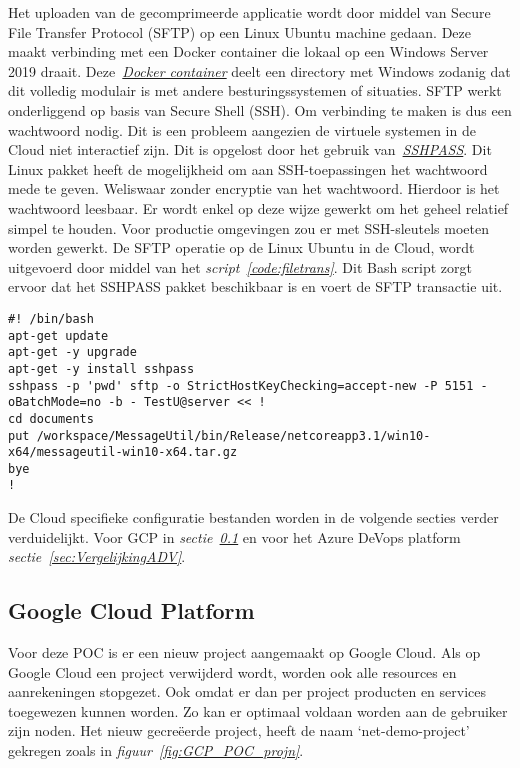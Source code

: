 Het uploaden van de gecomprimeerde applicatie wordt door middel van Secure File Transfer Protocol (SFTP) op een Linux Ubuntu machine gedaan. Deze maakt verbinding met een Docker container die lokaal op een Windows Server 2019 draait. Deze\emph{~\href{https://hub.docker.com/r/atmoz/sftp/}{Docker container}} deelt een directory met Windows zodanig dat dit volledig modulair is met andere besturingssystemen of situaties. SFTP werkt onderliggend op basis van Secure Shell (SSH). Om verbinding te maken is dus een wachtwoord nodig. Dit is een probleem aangezien de virtuele systemen in de Cloud niet interactief zijn. Dit is opgelost door het gebruik van\emph{~\href{https://linux.die.net/man/1/sshpass}{SSHPASS}}. Dit Linux pakket heeft de mogelijkheid om aan SSH-toepassingen het wachtwoord mede te geven. Weliswaar zonder encryptie van het wachtwoord. Hierdoor is het wachtwoord leesbaar. Er wordt enkel op deze wijze gewerkt om het geheel relatief simpel te houden. Voor productie omgevingen zou er met SSH-sleutels moeten worden gewerkt. De SFTP operatie op de Linux Ubuntu in de Cloud, wordt uitgevoerd door middel van het \emph{script~\ref{code:filetrans}}. Dit Bash script zorgt ervoor dat het SSHPASS pakket beschikbaar is en voert de SFTP transactie uit.

\begin{lstlisting}
#! /bin/bash
apt-get update
apt-get -y upgrade
apt-get -y install sshpass
sshpass -p 'pwd' sftp -o StrictHostKeyChecking=accept-new -P 5151 -oBatchMode=no -b - TestU@server << !
cd documents
put /workspace/MessageUtil/bin/Release/netcoreapp3.1/win10-x64/messageutil-win10-x64.tar.gz
bye
!
\end{lstlisting}

De Cloud specifieke configuratie bestanden worden in de volgende secties verder verduidelijkt. Voor GCP in \emph{sectie~\ref{sec:VergelijkingGCP}} en voor het Azure DeVops platform \emph{sectie~\ref{sec:VergelijkingADV}}.

\subsection{Google Cloud Platform}
\label{sec:VergelijkingGCP}
Voor deze POC is er een nieuw project aangemaakt op Google Cloud. Als op Google Cloud een project verwijderd wordt, worden ook alle resources en aanrekeningen stopgezet. Ook omdat er dan per project producten en services toegewezen kunnen worden. Zo kan er optimaal voldaan worden aan de gebruiker zijn noden. Het nieuw gecreëerde project, heeft de naam ‘net-demo-project’ gekregen zoals in \emph{figuur~\ref{fig:GCP_POC_projn}}.

